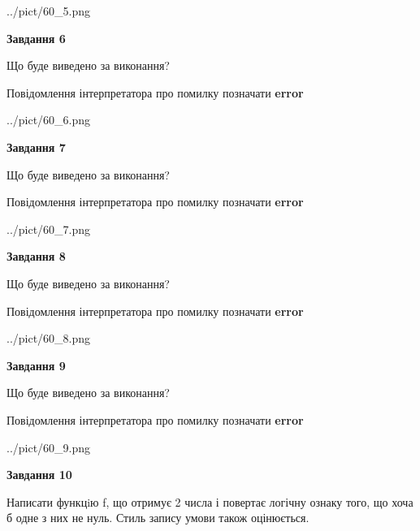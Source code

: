 \documentclass[12pt, ukrainian]{article}
\begin{document}
{\begin {large}
\begin{center}
	{../pict/60_5.png}
\end{center}
\newpage

{\begin {center}\textbf{Завдання 6}\end {center}}\par
Що буде виведено за виконання? \par
Повідомлення інтерпретатора про помилку позначати \textbf{error}

\begin{center}
	{../pict/60_6.png}
\end{center}
\newpage

{\begin {center}\textbf{Завдання 7}\end {center}}\par
Що буде виведено за виконання? \par
Повідомлення інтерпретатора про помилку позначати \textbf{error}

\begin{center}
	{../pict/60_7.png}
\end{center}
\newpage

{\begin {center}\textbf{Завдання 8}\end {center}}\par
Що буде виведено за виконання? \par
Повідомлення інтерпретатора про помилку позначати \textbf{error}

\begin{center}
	{../pict/60_8.png}
\end{center}
\newpage

{\begin {center}\textbf{Завдання 9}\end {center}}\par
Що буде виведено за виконання? \par
Повідомлення інтерпретатора про помилку позначати \textbf{error}

\begin{center}
	{../pict/60_9.png}
\end{center}
\newpage

{\begin {center}\textbf{Завдання 10}\end {center}}\par

Написати функцiю f, що отримує 2 числа і повертає логічну ознаку того, що хоча б одне з них не нуль. Стиль запису умови також оцінюється.\par
\newpage

\end {large}}
\end{document}
